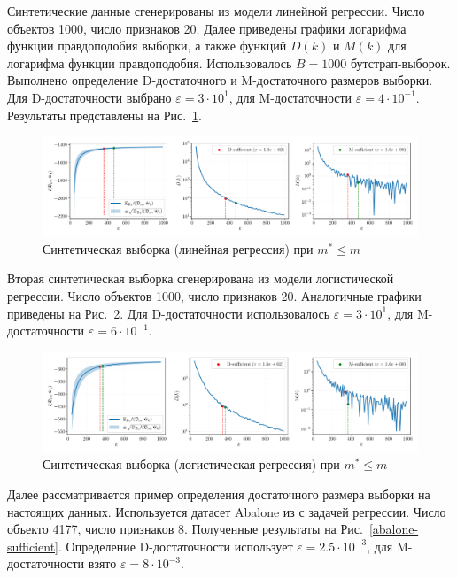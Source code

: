 Синтетические данные сгенерированы из модели линейной регрессии. Число объектов 1000, число признаков 20. Далее приведены графики логарифма функции правдоподобия выборки, а также функций $D(k)$ и $M(k)$ для логарифма функции правдоподобия. Использовалось $B=1000$ бутстрап-выборок. Выполнено определение D-достаточного и M-достаточного размеров выборки. Для D-достаточности выбрано $\varepsilon = 3 \cdot 10^{1}$, для M-достаточности $\varepsilon = 4 \cdot 10^{-1}$. Результаты представлены на Рис.~\ref{synthetic-regression-sufficient}. 

\begin{figure}[h!]
    \centering
    \includegraphics[width=\textwidth]{synthetic-regression-sufficient}
    \caption{Синтетическая выборка (линейная регрессия) при $m^* \leqslant m$}
    \label{synthetic-regression-sufficient}
\end{figure}

Вторая синтетическая выборка сгенерирована из модели логистической регрессии. Число объектов 1000, число признаков 20. Аналогичные графики приведены на Рис.~\ref{synthetic-classification-sufficient}. Для D-достаточности использовалось $\varepsilon = 3 \cdot 10^1$, для M-достаточности $\varepsilon = 6 \cdot 10^{-1}$.

\begin{figure}[h!]
    \centering
    \includegraphics[width=\textwidth]{synthetic-classification-sufficient}
    \caption{Синтетическая выборка (логистическая регрессия) при $m^* \leqslant m$}
    \label{synthetic-classification-sufficient}
\end{figure}

Далее рассматривается пример определения достаточного размера выборки на настоящих данных. Используется датасет Abalone из \citep{UCI} с задачей регрессии. Число объекто 4177, число признаков 8. Полученные результаты на Рис.~\ref{abalone-sufficient}. Определение D-достаточности использует $\varepsilon=2.5 \cdot 10^{-3}$, для M-достаточности взято $\varepsilon=8 \cdot 10^{-3}$.

